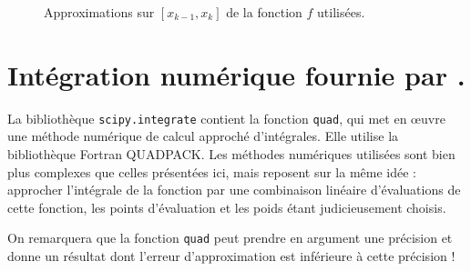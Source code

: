 \begin{figure}[!h]
  \begin{center}
    \caption{Approximations sur $[x_{k-1},x_{k}]$ de la fonction $f$ utilisées.}
    \label{fig.integrales}
  \end{center}
\end{figure}

\section{Intégration numérique fournie par \python.}

La bibliothèque \texttt{scipy.integrate} contient la fonction \texttt{quad}, qui met en \oe{}uvre une méthode numérique de calcul approché d'intégrales. 
Elle utilise la bibliothèque Fortran QUADPACK. 
Les méthodes numériques utilisées sont bien plus complexes que celles présentées ici, mais reposent sur la même idée : approcher l'intégrale de la fonction par une combinaison linéaire d'évaluations de cette fonction, les points d'évaluation et les poids étant judicieusement choisis. 

On remarquera que la fonction \texttt{quad} peut prendre en argument une précision et donne un résultat dont l'erreur d'approximation est inférieure à cette précision ! 


